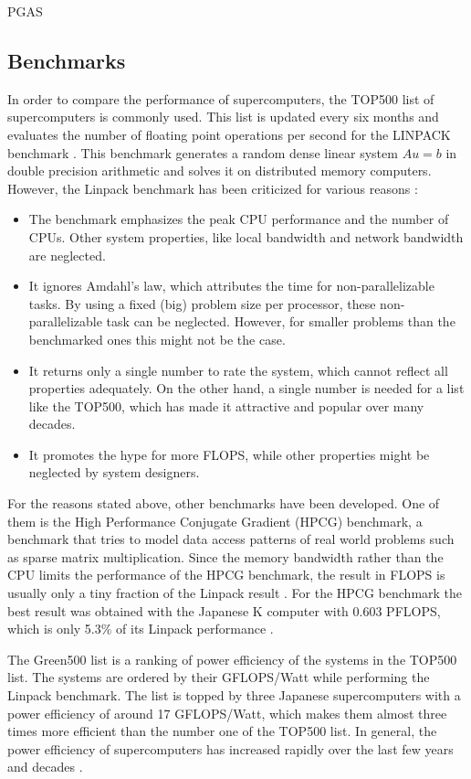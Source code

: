 PGAS \cite{coarfa2005evaluation}

\subsection{Benchmarks}
In order to compare the performance of supercomputers, the TOP500 list of supercomputers is commonly used. This list is updated every six months and evaluates the number of floating point operations per second for the LINPACK benchmark \cite{linpack}. This benchmark generates a random dense linear system $Au = b$ in double precision arithmetic and solves it on distributed memory computers. However, the Linpack benchmark has been criticized for various reasons \cite{dongarra2007hpc}:
\begin{itemize}
\item The benchmark emphasizes the peak CPU performance and the number of CPUs. Other system properties, like local bandwidth and network bandwidth are neglected.
\item It ignores Amdahl's law, which attributes the time for non-parallelizable tasks. By using a fixed (big) problem size per processor, these non-parallelizable task can be neglected. However, for smaller problems than the benchmarked ones this might not be the case.
\item It returns only a single number to rate the system, which cannot reflect all properties adequately. On the other hand, a single number is needed for a list like the TOP500, which has made it attractive and popular over many decades.
\item It promotes the hype for more FLOPS, while other properties might be neglected by system designers.  
\end{itemize}

For the reasons stated above, other benchmarks have been developed. One of them is the High Performance Conjugate Gradient (HPCG) benchmark, a benchmark that tries to model data access patterns of real world problems such as sparse matrix multiplication. Since the memory bandwidth rather than the CPU limits the performance of the HPCG benchmark, the result in FLOPS is usually only a tiny fraction of the Linpack result \cite{dongarra2013toward}. For the HPCG benchmark the best result was obtained with the Japanese K computer with 0.603 PFLOPS, which is only 5.3\% of its Linpack performance \cite{HPCG}.


The Green500 list is a ranking of power efficiency of the systems in the TOP500 list. The systems are ordered by their GFLOPS/Watt while performing the Linpack benchmark. The list is topped by three Japanese supercomputers with a power efficiency of around 17 GFLOPS/Watt, which makes them almost three times more efficient than the number one of the TOP500 list. In general, the power efficiency of supercomputers has increased rapidly over the last few years and decades \cite{green500}. 


